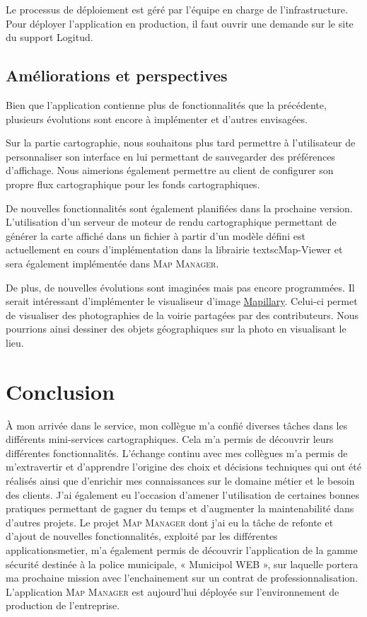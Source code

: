 \documentclass{rapportUHA40}
\begin{document}
Le processus de déploiement est géré par l'équipe en charge de
l'infrastructure. Pour déployer l'application en production, il faut ouvrir une
demande sur le site du support Logitud.

\newpage
\subsection{Améliorations et perspectives}
Bien que l'application contienne plus de fonctionnalités que la précédente,
plusieurs évolutions sont encore à implémenter et d'autres envisagées.

Sur la partie cartographie, nous souhaitons plus tard permettre à l'utilisateur
de personnaliser son interface en lui permettant de sauvegarder des préférences
d'affichage. Nous aimerions également permettre au client de configurer son
propre flux cartographique pour les fonds cartographiques.

De nouvelles fonctionnalités sont également planifiées dans la prochaine
version. L'utilisation d'un serveur de moteur de rendu cartographique
permettant de générer la carte affiché dans un fichier à partir d'un modèle
défini est actuellement en cours d'implémentation dans la librairie
textsc{Map-Viewer} et sera également implémentée dans \textsc{Map Manager}.

De plus, de nouvelles évolutions sont imaginées mais pas encore programmées. Il
serait intéressant d'implémenter le visualiseur d'image
\href{https://www.mapillary.com/app/}{Mapillary}. Celui-ci permet de visualiser
des photographies de la voirie partagées par des contributeurs. Nous pourrions
ainsi dessiner des objets géographiques sur la photo en visualisant le lieu.

\section{Conclusion}
À mon arrivée dans le service, mon collègue m’a confié diverses tâches dans les
différents mini-services cartographiques. Cela m'a permis de découvrir leurs
différentes fonctionnalités. L'échange continu avec mes collègues m'a permis de
m'extravertir et d’apprendre l’origine des choix et décisions techniques qui
ont été réalisés ainsi que d’enrichir mes connaissances sur le domaine métier
et le besoin des clients. J’ai également eu l’occasion d’amener l’utilisation
de certaines bonnes pratiques permettant de gagner du temps et d’augmenter la
maintenabilité dans d'autres projets. Le projet \textsc{Map Manager} dont j'ai
eu la tâche de refonte et d'ajout de nouvelles fonctionnalités, exploité par
les différentes \gls{applicationsmetier}, m’a également permis de découvrir
l’application de la gamme sécurité destinée à la police municipale, « Municipol
WEB », sur laquelle portera ma prochaine mission avec l’enchainement sur un
contrat de professionnalisation. L'application \textsc{Map Manager} est
aujourd'hui déployée sur l'environnement de production de l'entreprise.
\end{document}
